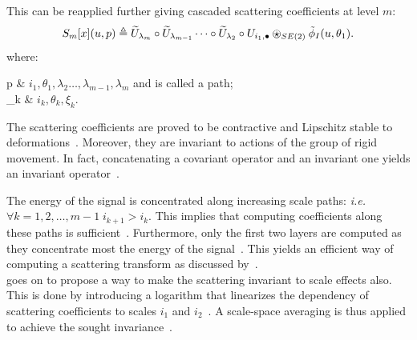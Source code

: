                     This can be reapplied further giving cascaded scattering coefficients at level $m$:
                    \begin{equation}
                        \label{eq::scatter_second}
                        S_m[x](u, p) \triangleq \widetilde{U}_{\lambda_m} \circ \widetilde{U}_{\lambda_{m-1}} \dots \circ \widetilde{U}_{\lambda_2} \circ U_{i_1, \bullet} \ostar_{SE(2)} \tilde{\phi}_I(u, \theta_1).
                    \end{equation}
                    where:
                    \begin{conditions}
                        p & $i_1, \theta_1, \lambda_2 \dots, \lambda_{m-1}, \lambda_m$ and is called a path;\\
                        \lambda_k & $i_k, \theta_k, \xi_k$.
                    \end{conditions}

                    The scattering coefficients are proved to be contractive and Lipschitz stable to deformations~\parencite{mallat2012group}.
                    Moreover, they are invariant to actions of the group of rigid movement.
                    In fact, concatenating a covariant operator and an invariant one yields an invariant operator~\parencite{mallat2012group,sifre2013rotation}.

                    The energy of the signal is concentrated along increasing scale paths: \textit{i.e.} $\forall k=1,2,\dots,m-1 \; i_{k+1} > i_k$.
                    This implies that computing coefficients along these paths is sufficient~\parencite{bruna2013invariant,sifre2013rotation,oyallon2015deep}.
                    Furthermore, only the first two layers are computed as they concentrate most the energy of the signal~\parencite{bruna2013invariant,sifre2013rotation,oyallon2015deep}.
                    This yields an efficient way of computing a scattering transform as discussed by~\textcite{oyallon2015deep,sifre2013rotation}.\\

                    \textcite{sifre2013rotation} goes on to propose a way to make the scattering invariant to scale effects also.
                    This is done by introducing a logarithm that linearizes the dependency of scattering coefficients to scales $i_1$ and $i_2$~\parencite{sifre2013rotation,oyallon2015deep}.
                    A scale-space averaging is thus applied to achieve the sought invariance~\parencite{sifre2013rotation}.\\

